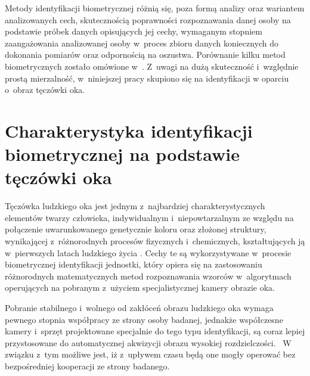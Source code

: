 Metody identyfikacji biometrycznej różnią się, poza formą analizy oraz wariantem analizowanych cech, skutecznością poprawności rozpoznawania danej osoby na podstawie próbek danych opisujących jej cechy, wymaganym stopniem zaangażowania analizowanej osoby w~proces zbioru danych koniecznych do dokonania pomiarów oraz odpornością na oszustwa. Porównanie kilku metod biometrycznych zostało omówione w~\cite{Gl11}. Z~uwagi na dużą skuteczność i~względnie prostą mierzalność, w~niniejszej pracy skupiono się na identyfikacji w oparciu o~obraz tęczówki oka.



\section{Charakterystyka identyfikacji biometrycznej na podstawie tęczówki oka}
\label{sec:zawartoscPracy}

Tęczówka ludzkiego oka jest jednym z~najbardziej charakterystycznych elementów twarzy człowieka, indywidualnym i~niepowtarzalnym ze względu na połączenie uwarunkowanego genetycznie koloru oraz złożonej struktury, wynikającej z~różnorodnych procesów fizycznych i~chemicznych, kształtujących ją w~pierwszych latach ludzkiego życia \cite{Iris01}\cite{Iris02}. Cechy te są wykorzystywane w~procesie biometrycznej identyfikacji jednostki, który opiera się na zastosowaniu różnorodnych matematycznych metod rozpoznawania wzorców w~algorytmach operujących na pobranym z~użyciem specjalistycznej kamery obrazie oka.

Pobranie stabilnego i~wolnego od zakłóceń obrazu ludzkiego oka wymaga pewnego stopnia współpracy ze strony osoby badanej, jednakże współczesne kamery i~sprzęt projektowane specjalnie do tego typu identyfikacji, są  coraz lepiej przystosowane do automatycznej akwizycji obrazu wysokiej rozdzielczości. ~W związku z~tym możliwe jest, iż z~upływem czasu będą one mogły operować bez bezpośredniej kooperacji ze strony badanego.


